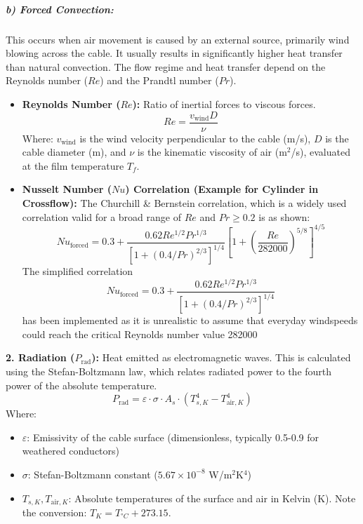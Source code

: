 \documentclass[12pt, a4paper]{article}
\begin{document}
\subparagraph{b) Forced Convection:}
This occurs when air movement is caused by an external source, primarily wind blowing across the cable. It usually results in significantly higher heat transfer than natural convection. The flow regime and heat transfer depend on the Reynolds number ($Re$) and the Prandtl number ($Pr$).
\begin{itemize}
    \item \textbf{Reynolds Number ($Re$):} Ratio of inertial forces to viscous forces.
        \begin{equation}
        Re = \frac{v_{\text{wind}} D}{\nu}
        \end{equation}
        Where: $v_{\text{wind}}$ is the wind velocity perpendicular to the cable (m/s), $D$ is the cable diameter (m), and $\nu$ is the kinematic viscosity of air (m$^2$/s), evaluated at the film temperature $T_f$.
    \item \textbf{Nusselt Number ($Nu$) Correlation (Example for Cylinder in Crossflow):} The  Churchill \& Bernstein correlation, which is a widely used correlation valid for a broad range of $Re$ and $Pr \ge 0.2$ is as shown: %
        \begin{equation}
        Nu_{\text{forced}} = 0.3 + \frac{0.62 Re^{1/2} Pr^{1/3}}{\left[1 + (0.4/Pr)^{2/3}\right]^{1/4}} \left[1 + \left(\frac{Re}{282000}\right)^{5/8}\right]^{4/5}
        \end{equation}
        The simplified correlation   \begin{equation}Nu_{\text{forced}} = 0.3 + \frac{0.62 Re^{1/2} Pr^{1/3}}{\left[1 + (0.4/Pr)^{2/3}\right]^{1/4}} 
        \end{equation}
        has been implemented as it is unrealistic to assume that everyday windspeeds could reach the critical Reynolds number value 282000
\end{itemize}


\textbf{2. Radiation ($P_{\text{rad}}$):} Heat emitted as electromagnetic waves.
This is calculated using the Stefan-Boltzmann law, which relates radiated power to the fourth power of the absolute temperature.
\begin{equation}
P_{\text{rad}} = \varepsilon \cdot \sigma \cdot A_s \cdot (T_{s,K}^4 - T_{\text{air},K}^4)
\end{equation}
Where:
\begin{itemize}
    \item $\varepsilon$: Emissivity of the cable surface (dimensionless, typically 0.5-0.9 for weathered conductors)
    \item $\sigma$: Stefan-Boltzmann constant ($5.67 \times 10^{-8}$ W/m$^2$K$^4$)
    \item $T_{s,K}, T_{\text{air},K}$: Absolute temperatures of the surface and air in Kelvin (K). Note the conversion: $T_K = T_{°C} + 273.15$.
\end{itemize}
\end{document}
